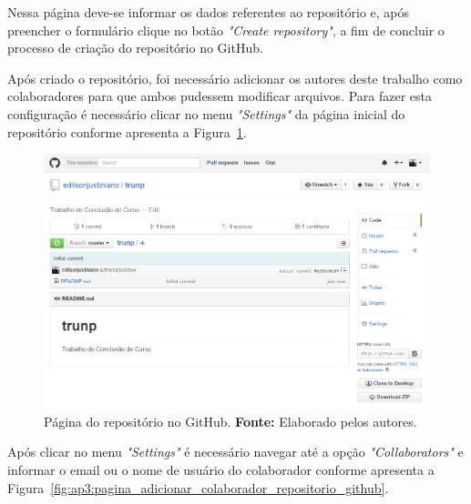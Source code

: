 Nessa página deve-se informar os dados referentes ao repositório e, após preencher o formulário clique no botão \textit{"Create repository"}, a fim de concluir o processo de criação do repositório no GitHub.

Após criado o repositório, foi necessário adicionar os autores deste trabalho como colaboradores para que ambos pudessem modificar arquivos. Para fazer esta configuração é necessário clicar no menu \textit{"Settings"} da página inicial do repositório conforme apresenta a Figura~\ref{fig:ap3:pagina_inicial_repositororio_github}.

\newpage
\captionsetup[figure]{list=no}
\begin{figure}[h!]
	\centerline{\includegraphics[scale=0.5]{./imagens/apendices/pagina-inicial-repositorio-github.png}}
	\caption[Página do repositório no GitHub.]
	{Página do repositório no GitHub. \textbf{Fonte:} Elaborado pelos autores.}
	\label{fig:ap3:pagina_inicial_repositororio_github}
\end{figure}

Após clicar no menu \textit{"Settings"} é necessário navegar até a opção \textit{"Collaborators"} e informar o email ou o nome de usuário do colaborador conforme apresenta a Figura~\ref{fig:ap3:pagina_adicionar_colaborador_repositorio_github}.

